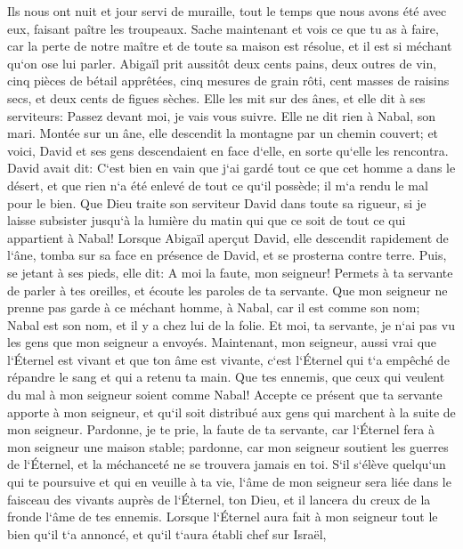 \verse Ils nous ont nuit et jour servi de muraille, tout le temps que nous avons été avec eux, faisant paître les troupeaux. 
\verse Sache maintenant et vois ce que tu as à faire, car la perte de notre maître et de toute sa maison est résolue, et il est si méchant qu`on ose lui parler. 
\verse Abigaïl prit aussitôt deux cents pains, deux outres de vin, cinq pièces de bétail apprêtées, cinq mesures de grain rôti, cent masses de raisins secs, et deux cents de figues sèches. Elle les mit sur des ânes, 
\verse et elle dit à ses serviteurs: Passez devant moi, je vais vous suivre. Elle ne dit rien à Nabal, son mari. 
\verse Montée sur un âne, elle descendit la montagne par un chemin couvert; et voici, David et ses gens descendaient en face d`elle, en sorte qu`elle les rencontra. 
\verse David avait dit: C`est bien en vain que j`ai gardé tout ce que cet homme a dans le désert, et que rien n`a été enlevé de tout ce qu`il possède; il m`a rendu le mal pour le bien. 
\verse Que Dieu traite son serviteur David dans toute sa rigueur, si je laisse subsister jusqu`à la lumière du matin qui que ce soit de tout ce qui appartient à Nabal! 
\verse Lorsque Abigaïl aperçut David, elle descendit rapidement de l`âne, tomba sur sa face en présence de David, et se prosterna contre terre. 
\verse Puis, se jetant à ses pieds, elle dit: A moi la faute, mon seigneur! Permets à ta servante de parler à tes oreilles, et écoute les paroles de ta servante. 
\verse Que mon seigneur ne prenne pas garde à ce méchant homme, à Nabal, car il est comme son nom; Nabal est son nom, et il y a chez lui de la folie. Et moi, ta servante, je n`ai pas vu les gens que mon seigneur a envoyés. 
\verse Maintenant, mon seigneur, aussi vrai que l`Éternel est vivant et que ton âme est vivante, c`est l`Éternel qui t`a empêché de répandre le sang et qui a retenu ta main. Que tes ennemis, que ceux qui veulent du mal à mon seigneur soient comme Nabal! 
\verse Accepte ce présent que ta servante apporte à mon seigneur, et qu`il soit distribué aux gens qui marchent à la suite de mon seigneur. 
\verse Pardonne, je te prie, la faute de ta servante, car l`Éternel fera à mon seigneur une maison stable; pardonne, car mon seigneur soutient les guerres de l`Éternel, et la méchanceté ne se trouvera jamais en toi. 
\verse S`il s`élève quelqu`un qui te poursuive et qui en veuille à ta vie, l`âme de mon seigneur sera liée dans le faisceau des vivants auprès de l`Éternel, ton Dieu, et il lancera du creux de la fronde l`âme de tes ennemis. 
\verse Lorsque l`Éternel aura fait à mon seigneur tout le bien qu`il t`a annoncé, et qu`il t`aura établi chef sur Israël, 
